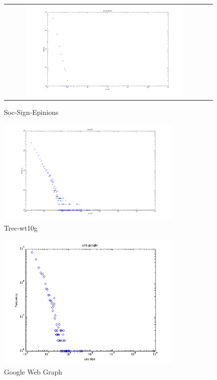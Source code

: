 \begin{figure}[!htbf]
\begin{center}
\begin{tabular}{cc}
     \includegraphics[width=0.8\textwidth]{FIG/t3_soc_sign_epinions.png} 
\end{tabular}
\caption{Soc-Sign-Epinions}
\label{t3:2}
\end{center}
\end{figure}


\begin{figure}[!htbf]
\begin{center}
     \includegraphics[width=0.8\textwidth]{FIG/t3_trec_wt10.png} 
\caption{Trec-wt10g}
\label{t3:3}
\end{center}
\end{figure}


\begin{figure}[!htbf]
\begin{center}
     \includegraphics[width=0.8\textwidth]{FIG/t3_web_google.png} 
\caption{Google Web Graph}
\label{t3:4}
\end{center}
\end{figure}



